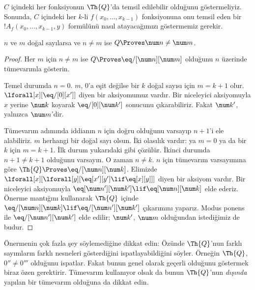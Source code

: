 


$C$ içindeki her fonksiyonun $\Th{Q}$'da temsil edilebilir olduğunu
göstermeliyiz. Sonunda, $C$ içindeki her $k$-li
$f(x_0,\dots,x_{k-1})$ fonksiyonuna onu temsil eden bir
$!A_f(x_0,\dots,x_{k-1},y)$ formülünü nasıl atayacağımızı göstermemiz gerekir.

\begin{lem}
$n$ ve $m$ doğal sayılarsa ve $n \neq m$ ise
$Q \Proves \num n \neq \num m$.
\end{lem}

\begin{proof}
Her $m$ için $n \neq m$ ise $Q \Proves \eq/[\num n][\num m]$ olduğunu
$n$ üzerinde tümevarımla gösterin.

Temel durumda $n = 0$. $m$, $0$'a eşit değilse bir $k$ doğal sayısı için
$m = k + 1$ olur. $\lforall[x][\eq/[0][x']]$ diyen bir aksiyomumuz vardır.
Bir niceleyici aksiyomuyla $x$ yerine $\num k$ koyarak
$\eq/[0][\num k']$ sonucunu çıkarabiliriz. Fakat $\num k'$, yalnızca
$\num m$'dir.

Tümevarım adımında iddianın $n$ için doğru olduğunu varsayıp $n+1$'i ele
alabiliriz. $m$ herhangi bir doğal sayı olsun. İki olasılık vardır: ya $m=0$
ya da bir $k$ için $m=k+1$. İlk durum yukarıdaki gibi çözülür. İkinci durumda
$n+1 \neq k+1$ olduğunu varsayın. O zaman $n \neq k$. $n$ için tümevarım
varsayımına göre $\Th{Q} \Proves \eq/[\num n][\num k]$. Elimizde
$\lforall[x][\lforall[y][\eq[x'][y'] \lif \eq[x][y]]]$ diyen bir aksiyom
vardır. Bir niceleyici aksiyomuyla
$\eq[\num n'][\num k'] \lif \eq[\num n][\num k]$ elde ederiz. Önerme
mantığını kullanarak $\Th{Q}$ içinde
$\eq/[\num n][\num k] \lif \eq/[\num n'][\num k']$ çıkarımını yaparız.
Modus ponens ile $\eq/[\num n'][\num k']$ elde edilir; $\num k'$,
$\num m$ olduğundan istediğimiz de budur.
\end{proof}

Önermenin çok fazla şey söylemediğine dikkat edin: Özünde $\Th{Q}$'nun farklı
sayımların farklı nesneleri gösterdiğini ispatlayabildiğini söyler. Örneğin
$\Th{Q}$, $0'' \neq 0'''$ olduğunu ispatlar. Fakat bunun genel olarak
geçerli olduğunu göstermek biraz özen gerektirir. Tümevarım kullanıyor olsak
da bunun $\Th{Q}$'nun \emph{dışında} yapılan bir tümevarım olduğuna da dikkat
edin.

